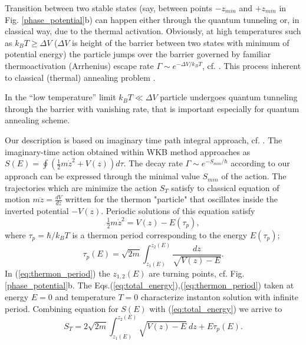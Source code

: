 \documentclass[aps, pre, preprint, groupedaddress, superscriptaddress, showkeys, showpacs] {revtex4-1}
\begin{document}
Transition between two stable states (say, between points $-z_{min}$ and $+z_{min}$ in Fig. \ref{phase_potential}b) can happen  either through the quantum tunneling or, in classical way, due to the thermal activation. 
Obviously, at high temperatures such as $k_{B}T\ge\Delta V$ ($\Delta V$ is height of the barrier between two states with minimum of potential energy) the particle jumps over the barrier governed by familiar thermoactivation (Arrhenius) escape rate $\Gamma \sim e^{-\Delta V /k_{B}T}$, cf. \cite{Larkin}. This process inherent to classical (thermal) annealing problem \cite{Das}. 

In the ``low temperature'' limit $k_{B}T\ll\Delta V$ particle undergoes quantum tunneling through the barrier with vanishing rate, that is important especially for quantum annealing scheme. 

Our description is based on imaginary time path integral approach, cf. \cite{Ankerhold}.
The imaginary-time action obtained within WKB method approaches as $S(E) = \oint (\tfrac{1}{2} m \dot{z}^2 + V(z)) d \tau$.
%
%
The decay rate $\Gamma \sim e^{-S_{min}/\hbar}$ according to our approach can be expressed through the minimal value $S_{min}$ of the action.
The trajectories which are minimize the action $S_T$ satisfy to classical equation of motion $m \ddot{z} = \frac{d V}{dz}$ written for the thermon "particle" that  oscillates inside the inverted potential $-V(z)$. 
%
%
Periodic solutions of this equation satisfy
%
\begin{equation}
\tfrac{1}{2} m \dot{z}^2 = V(z) - E(\tau_p),
\label{eq:total_energy}
\end{equation}
%
where $\tau_p = \hbar / k_B T$ is a thermon period corresponding to the energy $E(\tau_p)$;
%
\begin{equation}
\tau_p(E) = \sqrt{2 m} \int_{z_1(E)}^{z_2(E)} \frac{dz}{\sqrt{V(z) - E}}.
\label{eq:thermon_period}
\end{equation}
%
In (\ref{eq:thermon_period}) the $z_{1,2}(E)$ are turning points, cf. Fig. \ref{phase_potential}b.
The Eqs.(\ref{eq:total_energy}),(\ref{eq:thermon_period}) taken at energy $E = 0$ and temperature $T = 0$ characterize instanton solution with infinite period.
Combining  equation for $S(E)$ 
with (\ref{eq:total_energy}) we arrive to 
%
\begin{equation}
S_T = 2 \sqrt{2 m} \int_{z_1(E)}^{z_2(E)} \sqrt{V(z) - E} ~dz + E \tau_p (E).
\label{eq:thermon_action_2}
\end{equation}
%
\end{document}
